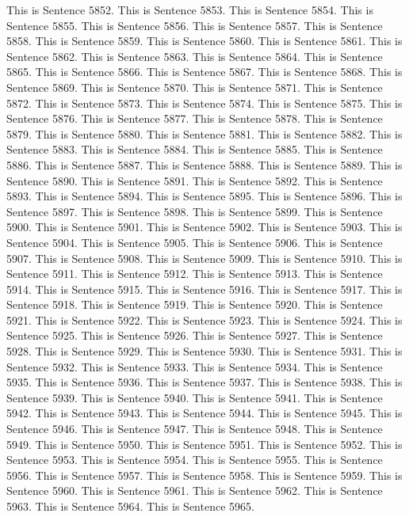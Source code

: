 \documentclass{article}
\begin{document}
This is Sentence 5852.
This is Sentence 5853.
This is Sentence 5854.
This is Sentence 5855.
This is Sentence 5856.
This is Sentence 5857.
This is Sentence 5858.
This is Sentence 5859.
This is Sentence 5860.
This is Sentence 5861.
This is Sentence 5862.
This is Sentence 5863.
This is Sentence 5864.
This is Sentence 5865.
This is Sentence 5866.
This is Sentence 5867.
This is Sentence 5868.
This is Sentence 5869.
This is Sentence 5870.
This is Sentence 5871.
This is Sentence 5872.
This is Sentence 5873.
This is Sentence 5874.
This is Sentence 5875.
This is Sentence 5876.
This is Sentence 5877.
This is Sentence 5878.
This is Sentence 5879.
This is Sentence 5880.
This is Sentence 5881.
This is Sentence 5882.
This is Sentence 5883.
This is Sentence 5884.
This is Sentence 5885.
This is Sentence 5886.
This is Sentence 5887.
This is Sentence 5888.
This is Sentence 5889.
This is Sentence 5890.
This is Sentence 5891.
This is Sentence 5892.
This is Sentence 5893.
This is Sentence 5894.
This is Sentence 5895.
This is Sentence 5896.
This is Sentence 5897.
This is Sentence 5898.
This is Sentence 5899.
This is Sentence 5900.
This is Sentence 5901.
This is Sentence 5902.
This is Sentence 5903.
This is Sentence 5904.
This is Sentence 5905.
This is Sentence 5906.
This is Sentence 5907.
This is Sentence 5908.
This is Sentence 5909.
This is Sentence 5910.
This is Sentence 5911.
This is Sentence 5912.
This is Sentence 5913.
This is Sentence 5914.
This is Sentence 5915.
This is Sentence 5916.
This is Sentence 5917.
This is Sentence 5918.
This is Sentence 5919.
This is Sentence 5920.
This is Sentence 5921.
This is Sentence 5922.
This is Sentence 5923.
This is Sentence 5924.
This is Sentence 5925.
This is Sentence 5926.
This is Sentence 5927.
This is Sentence 5928.
This is Sentence 5929.
This is Sentence 5930.
This is Sentence 5931.
This is Sentence 5932.
This is Sentence 5933.
This is Sentence 5934.
This is Sentence 5935.
This is Sentence 5936.
This is Sentence 5937.
This is Sentence 5938.
This is Sentence 5939.
This is Sentence 5940.
This is Sentence 5941.
This is Sentence 5942.
This is Sentence 5943.
This is Sentence 5944.
This is Sentence 5945.
This is Sentence 5946.
This is Sentence 5947.
This is Sentence 5948.
This is Sentence 5949.
This is Sentence 5950.
This is Sentence 5951.
This is Sentence 5952.
This is Sentence 5953.
This is Sentence 5954.
This is Sentence 5955.
This is Sentence 5956.
This is Sentence 5957.
This is Sentence 5958.
This is Sentence 5959.
This is Sentence 5960.
This is Sentence 5961.
This is Sentence 5962.
This is Sentence 5963.
This is Sentence 5964.
This is Sentence 5965.
\end{document}
